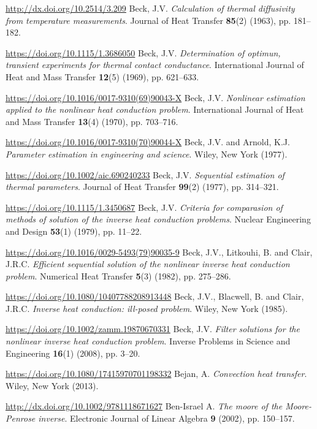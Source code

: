 \begin{thebibliography}{301}
\url{http://dx.doi.org/10.2514/3.209}
%
%
 Beck, J.V. {\it Calculation of thermal diffusivity from temperature measurements}. Journal of Heat Transfer {\bf 85}(2) (1963), pp. 181--182.

\url{https://doi.org/10.1115/1.3686050}
%
%
 Beck, J.V. {\it Determination of optimun, transient experiments for thermal contact conductance}. International Journal of Heat and Mass Transfer {\bf 12}(5) (1969), pp. 621--633.

\url{https://doi.org/10.1016/0017-9310(69)90043-X}
%
%
 Beck, J.V. {\it Nonlinear estimation applied to the nonlinear heat conduction problem}. International Journal of Heat and Mass Transfer {\bf 13}(4) (1970), pp. 703--716.

\url{https://doi.org/10.1016/0017-9310(70)90044-X}
%
%
 Beck, J.V. and Arnold, K.J. {\it Parameter estimation in engineering and science}. Wiley, New York (1977). 

\url{https://doi.org/10.1002/aic.690240233}
%
%
 Beck, J.V. {\it Sequential estimation of thermal parameters}. Journal of Heat Transfer {\bf 99}(2) (1977), pp. 314--321.

\url{https://doi.org/10.1115/1.3450687}
%
%
 Beck, J.V. {\it Criteria for comparasion of methods of solution of the inverse heat conduction problems}. Nuclear Engineering and Design {\bf 53}(1) (1979), pp. 11--22.

\url{https://doi.org/10.1016/0029-5493(79)90035-9}
%
%
 Beck, J.V., Litkouhi, B. and Clair, J.R.C. {\it Efficient sequential solution of the nonlinear inverse heat conduction problem}. Numerical Heat Transfer {\bf 5}(3) (1982), pp. 275--286.

\url{https://doi.org/10.1080/10407788208913448}
%
%
 Beck, J.V., Blacwell, B. and Clair, J.R.C. {\it Inverse heat conduction: ill-posed problem}. Wiley, New York (1985).

\url{https://doi.org/10.1002/zamm.19870670331}
%
%
 Beck, J.V. {\it Filter solutions for the nonlinear inverse heat conduction problem}. Inverse Problems in Science and Engineering {\bf 16}(1) (2008), pp. 3--20.

\url{https://doi.org/10.1080/17415970701198332}
%
%
 Bejan, A. {\it Convection heat transfer}. Wiley, New York (2013).

\url{http://dx.doi.org/10.1002/9781118671627}
%
%
 Ben-Israel A. {\it The moore of the Moore-Penrose inverse}. Electronic Journal of Linear Algebra {\bf 9} (2002), pp. 150--157.


\end{thebibliography}
